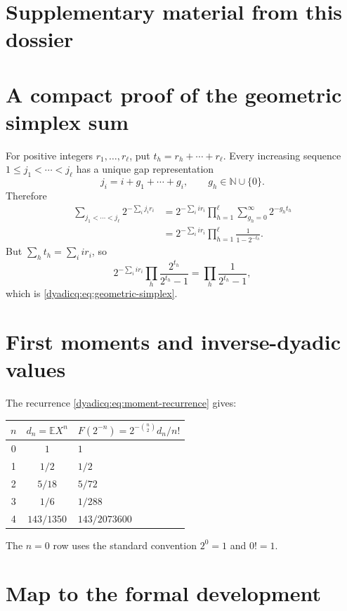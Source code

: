 \documentclass[11pt,oneside]{article}
\theoremstyle{definition}
\theoremstyle{remark}
\newcommand{\N}{\mathbb N}
\newcommand{\E}{\mathbb E}
\begin{document}
\clearpage
\section*{Supplementary material from this dossier}
\section{A compact proof of the geometric simplex sum}

For positive integers $r_1,\ldots,r_\ell$, put
$t_h=r_h+\cdots+r_\ell$.  Every increasing sequence
$1\le j_1<\cdots<j_\ell$ has a unique gap representation
\[
 j_i=i+g_1+\cdots+g_i,
 \qquad g_h\in\N\cup\{0\}.
\]
Therefore
\begin{align*}
 \sum_{j_1<\cdots<j_\ell}2^{-\sum_i j_ir_i}
 &=2^{-\sum_i ir_i}
   \prod_{h=1}^{\ell}
   \sum_{g_h=0}^{\infty}2^{-g_ht_h}\\
 &=2^{-\sum_i ir_i}
   \prod_{h=1}^{\ell}\frac1{1-2^{-t_h}}.
\end{align*}
But $\sum_ht_h=\sum_iir_i$, so
\[
 2^{-\sum_iir_i}\prod_h\frac{2^{t_h}}{2^{t_h}-1}
 =\prod_h\frac1{2^{t_h}-1},
\]
which is \eqref{dyadicq:eq:geometric-simplex}.

\section{First moments and inverse-dyadic values}

The recurrence \eqref{dyadicq:eq:moment-recurrence} gives:
\begin{center}
\renewcommand{\arraystretch}{1.18}
\begin{tabular}{ccl}
\toprule
$n$ & $d_n=\E X^n$ & $F(2^{-n})=2^{-\binom n2}d_n/n!$\\
\midrule
0 & $1$ & $1$\\
1 & $1/2$ & $1/2$\\
2 & $5/18$ & $5/72$\\
3 & $1/6$ & $1/288$\\
4 & $143/1350$ & $143/2073600$\\
\bottomrule
\end{tabular}
\end{center}
The $n=0$ row uses the standard convention $2^0=1$ and $0!=1$.

\section{Map to the formal development}
\end{document}
